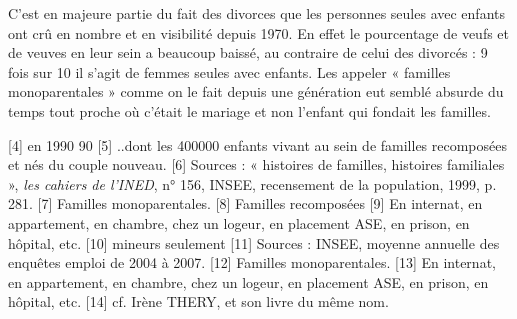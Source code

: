  C'est en majeure partie du fait des divorces que les personnes seules avec enfants ont crû en nombre et en visibilité depuis 1970. En effet le pourcentage de veufs et de veuves en leur sein a beaucoup baissé, au contraire de celui des divorcés : 9 fois sur 10 il s'agit de femmes seules avec enfants. Les appeler « familles monoparentales » comme on le fait depuis une génération eut semblé absurde du temps tout proche où c'était le mariage et non l'enfant qui fondait les familles. 
 
[4] en 1990 90%
[5] ..dont les 400000 enfants vivant au sein de familles recomposées et nés du couple nouveau.
[6] Sources : « histoires de familles, histoires familiales », \emph{les cahiers de l'INED}, n° 156, INSEE, recensement de la population, 1999, p. 281.
[7] Familles monoparentales.
[8] Familles recomposées
[9] En internat, en appartement, en chambre, chez un logeur, en placement ASE, en prison, en hôpital, etc.
[10] mineurs seulement
[11] Sources : INSEE, moyenne annuelle des enquêtes emploi de 2004 à 2007.
[12] Familles monoparentales.
[13] En internat, en appartement, en chambre, chez un logeur, en placement ASE, en prison, en hôpital, etc.
[14] cf. Irène THERY, et son livre du même nom.